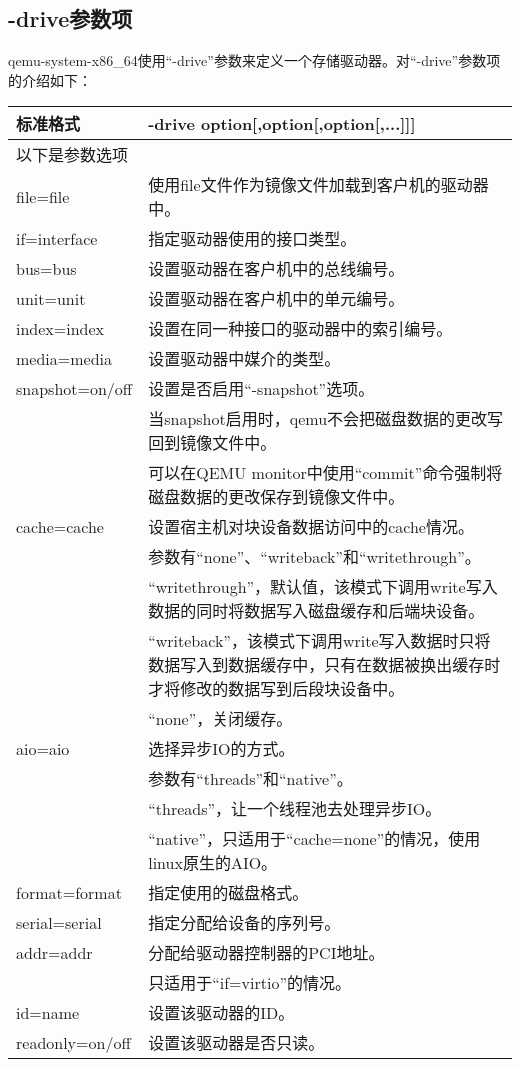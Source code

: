 \documentclass[a4paper,left=2.5cm,right=2.5cm,11pt]{article}
\newcommand{\interval}{\vspace{0.5em}}
\begin{document}
\subsection{-drive参数项}
	qemu-system-x86\_64使用“-drive”参数来定义一个存储驱动器。对“-drive”参数项的介绍如下：
	\interval
	\begin{longtable}{p{3cm}p{10cm}}
	\hline
	标准格式 & -drive option[,option[,option[,...]]] \\
	\hline
	以下是参数选项 & \\
	\hline
	file=file & 使用file文件作为镜像文件加载到客户机的驱动器中。 \\
	\hline
	if=interface & 指定驱动器使用的接口类型。\\
	\hline
	bus=bus & 设置驱动器在客户机中的总线编号。\\
	\hline
	unit=unit & 设置驱动器在客户机中的单元编号。 \\
	\hline
	index=index & 设置在同一种接口的驱动器中的索引编号。 \\
	\hline
	media=media & 设置驱动器中媒介的类型。 \\
	\hline
	snapshot=on/off & 设置是否启用“-snapshot”选项。 \\
					  & 当snapshot启用时，qemu不会把磁盘数据的更改写回到镜像文件中。\\
					  & 可以在QEMU monitor中使用“commit”命令强制将磁盘数据的更改保存到镜像文件中。\\
	\hline
	cache=cache & 设置宿主机对块设备数据访问中的cache情况。\\
		        & 参数有“none”、“writeback”和“writethrough”。\\
				& “writethrough”，默认值，该模式下调用write写入数据的同时将数据写入磁盘缓存和后端块设备。\\
				& “writeback”，该模式下调用write写入数据时只将数据写入到数据缓存中，只有在数据被换出缓存时才将修改的数据写到后段块设备中。\\
				& “none”，关闭缓存。\\
	\hline
	aio=aio & 选择异步IO的方式。\\
		    & 参数有“threads”和“native”。\\
			& “threads”，让一个线程池去处理异步IO。\\
			& “native”，只适用于“cache=none”的情况，使用linux原生的AIO。\\
	\hline
	format=format & 指定使用的磁盘格式。\\
	\hline
	serial=serial & 指定分配给设备的序列号。\\
	\hline
	addr=addr & 分配给驱动器控制器的PCI地址。\\
			  & 只适用于“if=virtio”的情况。\\
	\hline
	id=name & 设置该驱动器的ID。\\
	\hline
	readonly=on/off & 设置该驱动器是否只读。\\
	\hline
	\end{longtable}
	\interval
\end{document}
